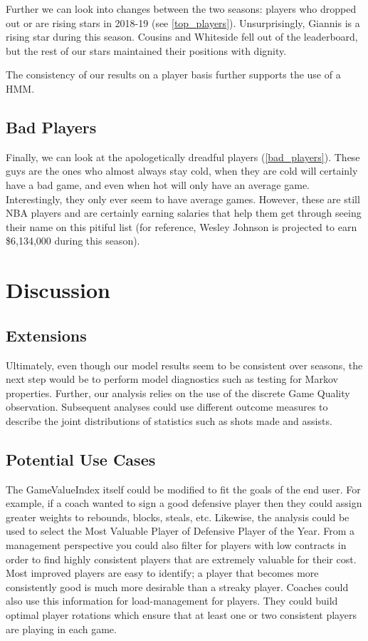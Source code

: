 \documentclass[12pt, authoryear]{elsarticle}
\begin{document}
Further we can look into changes between the two seasons: players who dropped out or are rising stars in 2018-19 (see \ref{top_players}). Unsurprisingly, Giannis is a rising star during this season. Cousins and Whiteside fell out of the leaderboard, but the rest of our stars maintained their positions with dignity.

The consistency of our results on a player basis further supports the use of a HMM.

\subsection{Bad Players}

Finally, we can look at the apologetically dreadful players (\ref{bad_players}). These guys are the ones who almost always stay cold, when they are cold will certainly have a bad game, and even when hot will only have an average game. Interestingly, they only ever seem to have average games. However, these are still NBA players and are certainly earning salaries that help them get through seeing their name on this pitiful list (for reference, Wesley Johnson is projected to earn \$6,134,000 during this season). 

\section{Discussion}

\subsection{Extensions}

Ultimately, even though our model results seem to be consistent over seasons, the next step would be to perform model diagnostics such as testing for Markov properties. Further,  our analysis relies on the use of the discrete Game Quality observation. Subsequent analyses could use different outcome measures to describe the joint distributions of statistics such as shots made and assists. 

\subsection{Potential Use Cases}

The GameValueIndex itself could be modified to fit the goals of the end user. For example, if a coach wanted to sign a good defensive player then they could assign greater weights to rebounds, blocks, steals, etc. Likewise, the analysis could be used to select the Most Valuable Player of Defensive Player of the Year. From a management perspective you could also filter for players with low contracts in order to find highly consistent players that are extremely valuable for their cost. Most improved players are easy to identify; a player that becomes more consistently good is much more desirable than a streaky player. Coaches could also use this information for load-management for players. They could build optimal player rotations which ensure that at least one or two consistent players are playing in each game. 
\end{document}
